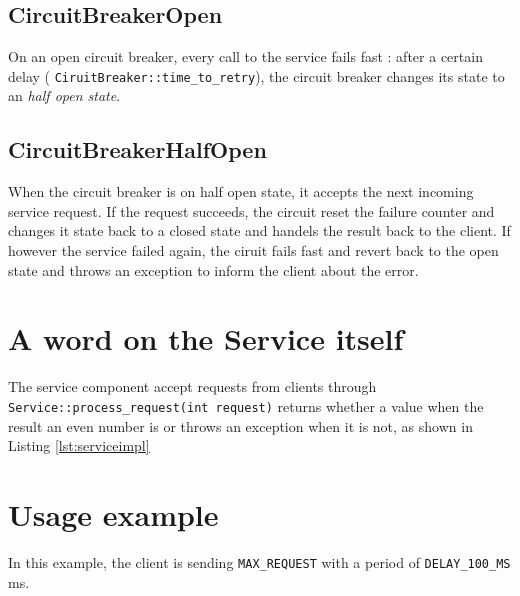 \documentclass[a4paper,12pt]{article}
\begin{document}
\subsection{CircuitBreakerOpen} \label{subsec:fsm_open}

 
 On an open circuit breaker, every call to the service fails fast : after a certain delay ( \verb+CiruitBreaker::time_to_retry+), the circuit breaker changes its state to an \textit{half open state}.
 
 
 \subsection{CircuitBreakerHalfOpen} \label{subsec:fsm_halfopen}

 When the circuit breaker is on half open state, it accepts the next incoming service request.
 If the request succeeds, the circuit reset the failure counter and changes it state back to a closed state and handels the result back to the client. If however the service failed again, the ciruit fails fast and revert back to the open state and throws an exception to inform the client about the error.
\newpage
\section{A word on the Service itself } \label{sec:service}





The service component accept requests from clients through \\
\verb+Service::process_request(int request)+ returns whether a value when the result an even number is or throws an exception when it is not, as shown in Listing \ref{lst:serviceimpl}
 

\section{Usage example} \label{sec:usage}


In this example, the client is sending \verb+MAX_REQUEST+ with a period of \verb+DELAY_100_MS+ ms.
\end{document}
